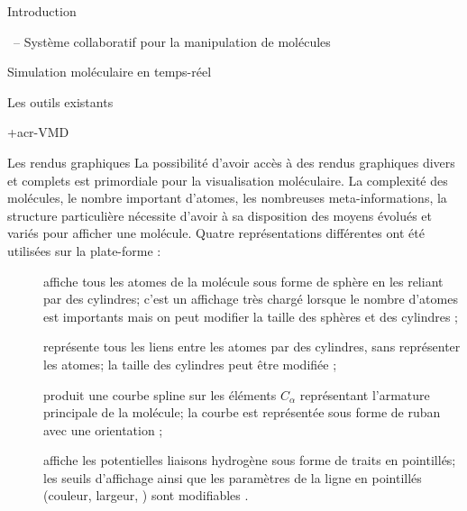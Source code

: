 \documentclass[myfrancais]{mythesis}
\begin{document}
\begin{mypart}{Introduction}
\begin{mychapter}{\myShaddock\ -- Système collaboratif pour la manipulation de molécules}
\begin{mysection}{Simulation moléculaire en temps-réel}
\begin{mysubsection}{Les outils existants}
\begin{mysubsubsection}{\myacronl+{acr-VMD}}
						\begin{myparagraph}{Les rendus graphiques}
							La possibilité d'avoir accès à des rendus graphiques divers et complets est primordiale pour la visualisation moléculaire.
							La complexité des molécules, le nombre important d'atomes, les nombreuses meta-informations, la structure particulière nécessite d'avoir à sa disposition des moyens évolués et variés pour afficher une molécule.
							Quatre représentations différentes  ont été utilisées sur la plate-forme \myShaddock :
							\begin{description}
								\item[\myCPK] affiche tous les atomes de la molécule sous forme de sphère en les reliant par des cylindres; c'est un affichage très chargé lorsque le nombre d'atomes est importants mais on peut modifier la taille des sphères et des cylindres ;
								\item[\myLicorice] représente tous les liens entre les atomes par des cylindres, sans représenter les atomes; la taille des cylindres peut être modifiée ;
								\item[\myNewRibbon] produit une courbe spline sur les éléments $C_{\alpha}$ représentant l'armature principale de la molécule; la courbe est représentée sous forme de ruban avec une orientation ;
								\item[\myHBonds] affiche les potentielles liaisons hydrogène sous forme de traits en pointillés; les seuils d'affichage ainsi que les paramètres de la ligne en pointillés (couleur, largeur, \myetc) sont modifiables .
							\end{description}


\end{myparagraph}
\end{mysubsubsection}
\end{mysubsection}
\end{mysection}
\end{mychapter}
\end{mypart}
\end{document}
